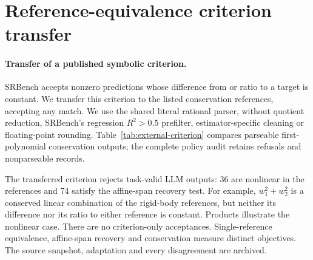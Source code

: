 \documentclass[10pt]{article}
\begin{document}
\clearpage
\section{Reference-equivalence criterion transfer}\label{app:criterion-transfer}

\paragraph{Transfer of a published symbolic criterion.} SRBench \citep{lacava2021srbench} accepts nonzero predictions whose difference from or ratio to a target is constant. We transfer this criterion to the listed conservation references, accepting any match. We use the shared literal rational parser, without quotient reduction, SRBench's regression $R^2>0.5$ prefilter, estimator-specific cleaning or floating-point rounding. Table~\ref{tab:external-criterion} compares parseable first-polynomial conservation outputs; the complete policy audit retains refusals and nonparseable records.

The transferred criterion rejects \nCriterionTaskOnly{} task-valid LLM outputs: 36 are nonlinear in the references and 74 satisfy the affine-span recovery test. For example, $w_1^2+w_2^2$ is a conserved linear combination of the rigid-body references, but neither its difference nor its ratio to either reference is constant. Products illustrate the nonlinear case. There are no criterion-only acceptances. Single-reference equivalence, affine-span recovery and conservation measure distinct objectives. The source snapshot, adaptation and every disagreement are archived.

\begin{table}[!htbp]
\centering\small
\tabExternalCriterion
\caption{Transferred SRBench symbolic criterion versus literal conservation-task validity on the same parseable first outputs. The two ``only'' columns are paired disagreements. Sparse float denotes the archived numerical baseline.}
\label{tab:external-criterion}
\end{table}
\end{document}
